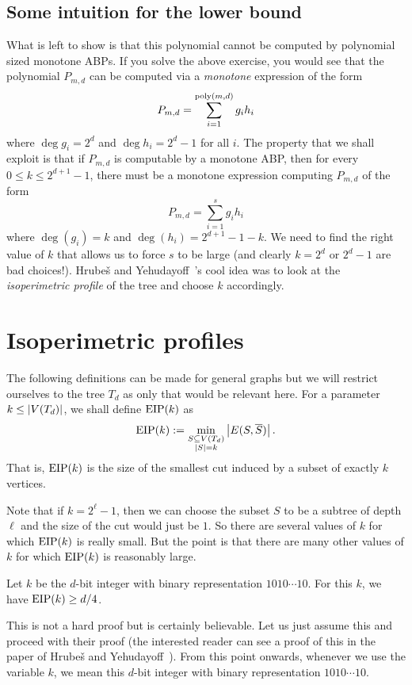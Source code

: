 \subsection{Some intuition for the lower bound}

What is left to show is that this polynomial cannot be computed by polynomial sized monotone ABPs. If you solve the above exercise, you would see that the polynomial $P_{m,d}$ can be computed via a \emph{monotone} expression of the form
\[
  P_{m,d} = \sum_{i=1}^{\operatorname{poly}(m,d)} g_i h_i
\]
where $\deg g_i = 2^d$ and $\deg h_i = 2^{d}-1$ for all $i$. The property that we shall exploit is that if $P_{m,d}$ is computable by a monotone ABP, then for every $0\leq k \leq 2^{d+1} - 1$, there must be a monotone expression computing $P_{m,d}$ of the form
\[
P_{m,d} = \sum_{i=1}^{s} g_i h_i
\]
where $\deg(g_i) = k$ and $\deg(h_i) = 2^{d+1} - 1 - k$. We need to find the right value of $k$ that allows us to force $s$ to be large (and clearly $k = 2^d$ or $2^{d} -1$ are bad choices!). Hrube\v{s} and Yehudayoff~\cite{HY16}'s cool idea was to look at the \emph{isoperimetric profile} of the tree and choose $k$ accordingly.

\section{Isoperimetric profiles}

The following definitions can be made for general graphs but we will restrict ourselves to the tree $T_d$ as only that would be relevant here. For a parameter $k \leq \left|V(T_d)\right|$, we shall define $\operatorname{EIP}(k)$ as
\[
  \operatorname{EIP}(k) := \min_{\substack{S\subseteq V(T_d)\\|S| = k}} \left|E(S,\overline{S})\right|.
\]
That is, $\operatorname{EIP}(k)$ is the size of the smallest cut induced by a subset of exactly $k$ vertices.

Note that if $k = 2^\ell - 1$, then we can choose the subset $S$ to be a subtree of depth $\ell$ and the size of the cut would just be $1$.
So there are several values of $k$ for which $\operatorname{EIP}(k)$ is really small.
But the point is that there are many other values of $k$ for which $\operatorname{EIP}(k)$ is reasonably large.

\begin{lemma}\label{lem:eip-for-good-k}
  Let $k$ be the $d$-bit integer with binary representation $1010\cdots 10$. For this $k$, we have $\operatorname{EIP}(k) \geq d/4$.
\end{lemma}

This is not a hard proof but is certainly believable. Let us just assume this and proceed with their proof (the interested reader can see a proof of this in the paper of Hrube\v{s} and Yehudayoff~\cite{HY16}). From this point onwards, whenever we use the variable $k$, we mean this $d$-bit integer with binary representation $1010\cdots10$.

